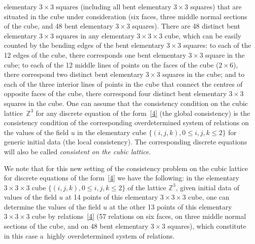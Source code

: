 elementary $3 \times 3$ squares (including all bent elementary $3
\times 3$ squares) that are situated in the cube under consideration
(six faces, three middle normal sections of the cube, and 48 bent
elementary $3 \times 3$ squares). There are 48 distinct bent
elementary $3 \times 3$ squares in any elementary $3 \times 3 \times
3$ cube, which can be easily counted by the bending edges of the
bent elementary $3 \times 3$ squares: to each of the 12 edges of the
cube, there corresponds one bent elementary $3 \times 3$ square in
the cube; to each of the 12 middle lines of points on the faces of
the cube ($2 \times 6$), there correspond two distinct bent
elementary $3 \times 3$ squares in the cube; and to each of the
three interior lines of points in the cube that connect the centres
of opposite faces of the cube, there correspond four distinct bent
elementary $3 \times 3$ squares in the cube. One can assume that the
consistency condition on the cubic lattice~$\mathbb{Z}^3$ for any
discrete equation of the form~\eqref{4} (the global consistency) is the consistency condition
of the corresponding overdetermined system of relations on the
values of the f\/ield $u$ in the elementary cube $\{(i, j, k), 0
\leq i, j, k \leq 2 \}$ for generic initial data (the local consistency). The corresponding
discrete equations will also be called {\it consistent on the cubic
lattice}.




We note that for this new setting of the consistency problem on the
cubic lattice for discrete equations of the form~\eqref{4} we have
the following: in the elementary $3 \times 3 \times 3$ cube $\{(i,
j, k),  0 \leq i, j, k \leq 2 \}$ of the lattice $\mathbb{Z}^3$,
given initial data of values of the f\/ield $u$ at 14 points of this
elementary $3 \times 3 \times 3$ cube, one can determine the values
of the f\/ield $u$ at the other 13 points of this elementary $3 \times
3 \times 3$ cube by relations~\eqref{4} (57 relations on six faces,
on three middle normal sections of the cube, and on 48 bent
elementary $3 \times 3$ squares), which constitute in this case a~highly overdetermined system of relations.


